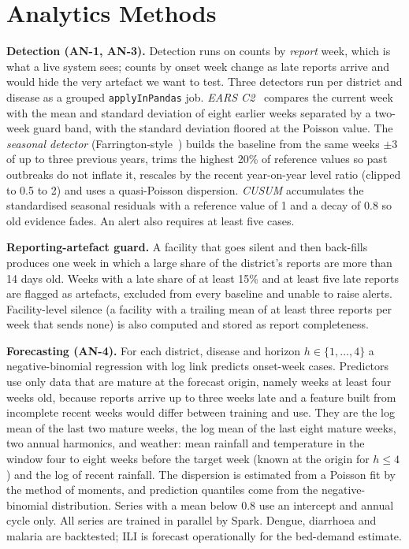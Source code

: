 \section{Analytics Methods}\label{sec:methods}
\textbf{Detection (AN-1, AN-3).} Detection runs on counts by \emph{report} week, which is what a live system sees; counts by onset week change as late reports arrive and would hide the very artefact we want to test. Three detectors run per district and disease as a grouped \texttt{applyInPandas} job. \emph{EARS C2}~\cite{ears} compares the current week with the mean and standard deviation of eight earlier weeks separated by a two-week guard band, with the standard deviation floored at the Poisson value. The \emph{seasonal detector} (Farrington-style~\cite{farr}) builds the baseline from the same weeks $\pm3$ of up to three previous years, trims the highest 20\% of reference values so past outbreaks do not inflate it, rescales by the recent year-on-year level ratio (clipped to 0.5 to 2) and uses a quasi-Poisson dispersion. \emph{CUSUM} accumulates the standardised seasonal residuals with a reference value of 1 and a decay of 0.8 so old evidence fades. An alert also requires at least five cases.

\textbf{Reporting-artefact guard.} A facility that goes silent and then back-fills produces one week in which a large share of the district's reports are more than 14 days old. Weeks with a late share of at least 15\% and at least five late reports are flagged as artefacts, excluded from every baseline and unable to raise alerts. Facility-level silence (a facility with a trailing mean of at least three reports per week that sends none) is also computed and stored as report completeness.

\textbf{Forecasting (AN-4).} For each district, disease and horizon $h\in\{1,\dots,4\}$ a negative-binomial regression with log link predicts onset-week cases. Predictors use only data that are mature at the forecast origin, namely weeks at least four weeks old, because reports arrive up to three weeks late and a feature built from incomplete recent weeks would differ between training and use. They are the log mean of the last two mature weeks, the log mean of the last eight mature weeks, two annual harmonics, and weather: mean rainfall and temperature in the window four to eight weeks before the target week (known at the origin for $h\le4$) and the log of recent rainfall. The dispersion is estimated from a Poisson fit by the method of moments, and prediction quantiles come from the negative-binomial distribution. Series with a mean below 0.8 use an intercept and annual cycle only. All series are trained in parallel by Spark. Dengue, diarrhoea and malaria are backtested; ILI is forecast operationally for the bed-demand estimate.

